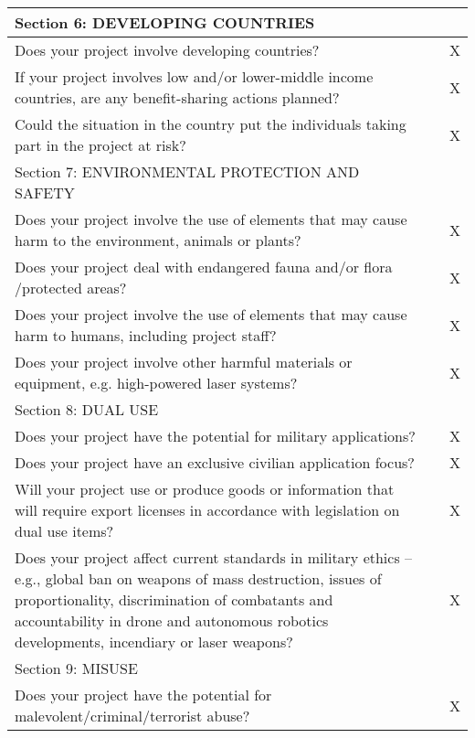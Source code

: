 \begin{longtable}{|p{12cm}|p{1cm}|p{1cm}|}
Section 6: DEVELOPING COUNTRIES                                &     &    \\ \hline
Does your project involve developing countries?                 &     & X  \\ \hline
If your project involves low and/or lower-middle income countries, are any benefit-sharing actions planned?            &     & X  \\ \hline
Could the situation in the country put the individuals taking part in the project at risk?                                   &     & X  \\ \hline
\rowcolor[HTML]{FFFE65} 
Section 7: ENVIRONMENTAL PROTECTION AND SAFETY                 &     &    \\ \hline
Does your project involve the use of elements that may cause harm to the environment, animals or plants?                    &     & X  \\ \hline
Does your project deal with endangered fauna and/or flora /protected areas?                                              &     & X  \\ \hline
Does your project involve the use of elements that may cause harm to humans, including project staff?                       &     & X  \\ \hline
Does your project involve other harmful materials or equipment, e.g. high-powered laser systems?                               &     & X  \\ \hline
\rowcolor[HTML]{FFFE65} 
Section 8: DUAL USE                                            &     &    \\ \hline
Does your project have the potential for military applications?  &     & X  \\ \hline
Does your project have an exclusive civilian application focus?  &     & X  \\ \hline
Will your project use or produce goods or information that will require export licenses in accordance with legislation on dual use items?  &     & X  \\ \hline
Does your project affect current standards in military ethics – e.g., global ban on weapons of mass destruction, issues of proportionality, discrimination of combatants and accountability in drone and autonomous robotics developments, incendiary or laser weapons? &     & X  \\ \hline
\rowcolor[HTML]{FFFE65} 
Section 9: MISUSE  &     &    \\ \hline
Does your project have the potential for malevolent/criminal/terrorist abuse?   &     & X  \\ \hline

\end{longtable}
